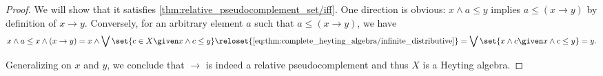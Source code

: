 \begin{proof}
  We will show that it satisfies \cref{thm:relative_pseudocomplement_set/iff}. One direction is obvious: \( x \wedge a \leq y \) implies \( a \leq (x \rightarrow y) \) by definition of \( x \rightarrow y \). Conversely, for an arbitrary element \( a \) such that \( a \leq (x \rightarrow y) \), we have
  \begin{equation*}
    x \wedge a
    \leq
    x \wedge (x \rightarrow y)
    =
    x \wedge \bigvee\set{ c \in X \given x \wedge c \leq y }
    \reloset {\eqref{eq:thm:complete_heyting_algebra/infinite_distributive}} =
    \bigvee\set{ x \wedge c \given x \wedge c \leq y }
    =
    y.
  \end{equation*}

  Generalizing on \( x \) and \( y \), we conclude that \( {\rightarrow} \) is indeed a relative pseudocomplement and thus \( X \) is a Heyting algebra.
\end{proof}

